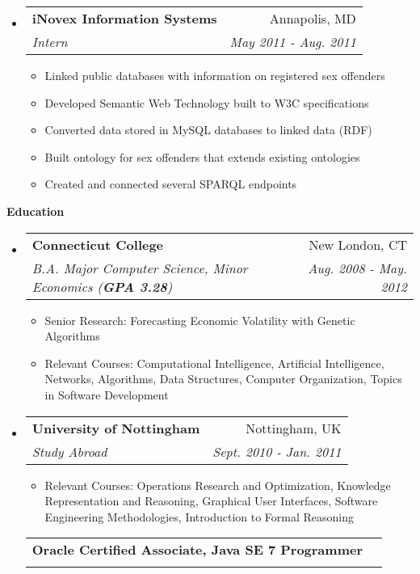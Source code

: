 \documentclass[letterpaper,11pt]{article}
\makeatletter
\newcommand{\resitem}[1]{\item #1 \vspace{-2pt}}
\newcommand{\resheading}[1]{{\large \colorbox{mygrey}{\begin{minipage}{\textwidth}{\textbf{#1 \vphantom{p\^{E}}}}\end{minipage}}}}
\newcommand{\ressubheading}[4]{
\begin{tabular*}{7.0in}{l@{\extracolsep{\fill}}r}
		\textbf{#1} & #2 \\
		\textit{#3} & \textit{#4} \\
\end{tabular*}\vspace{-6pt}}
\makeatother
\begin{document}
\begin{itemize}
	\item
	\ressubheading{iNovex Information Systems}{Annapolis, MD}{Intern}{May 2011 - Aug. 2011}
	\begin{itemize}
		\resitem{Linked public databases with information on registered sex offenders}
		\resitem{Developed Semantic Web Technology built to W3C specifications}
		\resitem{Converted data stored in MySQL databases to linked data (RDF)}
		\resitem{Built ontology for sex offenders that extends existing ontologies}
		\resitem{Created and connected several SPARQL endpoints}
	\end{itemize}
\end{itemize}

\resheading{Education}
\begin{itemize}
	\item
	\ressubheading{Connecticut College}{New London, CT}{B.A. Major Computer Science, Minor Economics (\textbf{GPA 3.28})}{Aug. 2008 - May. 2012}
	\begin{itemize}
		\resitem{Senior Research: Forecasting Economic Volatility with Genetic Algorithms}
		\resitem{Relevant Courses: Computational Intelligence, Artificial Intelligence, Networks, Algorithms, Data Structures, Computer Organization, Topics in Software Development}
	\end{itemize}
	
	\item
	\ressubheading{University of Nottingham}{Nottingham, UK}{Study Abroad}{Sept. 2010 - Jan. 2011}
	\begin{itemize}
		\resitem{Relevant Courses: Operations Research and Optimization, Knowledge Representation and Reasoning, Graphical User Interfaces, Software Engineering Methodologies, Introduction to Formal Reasoning}
	\end{itemize}
	\ressubheading{Oracle Certified Associate, Java SE 7 Programmer}{}{}{}
\end{itemize}
\end{document}
